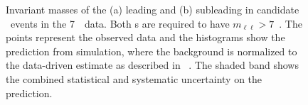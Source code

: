 \begin{figure}[htbp]
    \begin{center}
    \label{fig:zzdists-7tev-Zmass}
    \caption[Invariant masses of the (a) leading and (b) subleading \leppair
    in candidate \ZZ\ events in the 7~\tev\ data.]
    {Invariant masses of the (a) leading and (b) subleading \leppair
    in candidate \ZZ\ events in the 7~\tev\ data. Both \leppair s are required to have
    $m_{\ell\ell}>7$~\gev.  The points represent the observed data and the
    histograms show the prediction from simulation, where the background is
    normalized to the data-driven estimate as described in
    ~. The shaded band shows the combined statistical and
    systematic uncertainty on the prediction. 
}
\end{center}
\end{figure}

